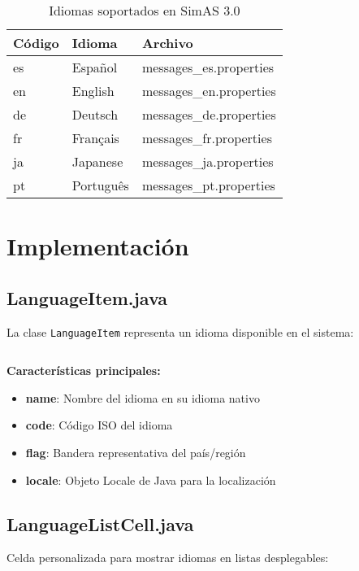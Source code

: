 \begin{table}[H]
\centering
\begin{tabular}{|l|l|l|}
\hline
\textbf{Código} & \textbf{Idioma} & \textbf{Archivo} \\
\hline
es & Español & messages\_es.properties \\
\hline
en & English & messages\_en.properties \\
\hline
de & Deutsch & messages\_de.properties \\
\hline
fr & Français & messages\_fr.properties \\
\hline
ja & Japanese & messages\_ja.properties \\
\hline
pt & Português & messages\_pt.properties \\
\hline
\end{tabular}
\caption{Idiomas soportados en SimAS 3.0}
\label{tab:idiomas-soportados}
\end{table}

\section{Implementación}

\subsection{LanguageItem.java}

La clase \texttt{LanguageItem} representa un idioma disponible en el sistema:

\inputminted[linenos,breaklines]{java}{codigo/src/utils/LanguageItem.java}

\textbf{Características principales:}

\begin{itemize}
    \item \textbf{name}: Nombre del idioma en su idioma nativo
    \item \textbf{code}: Código ISO del idioma
    \item \textbf{flag}: Bandera representativa del país/región
    \item \textbf{locale}: Objeto Locale de Java para la localización
\end{itemize}

\subsection{LanguageListCell.java}

Celda personalizada para mostrar idiomas en listas desplegables:

